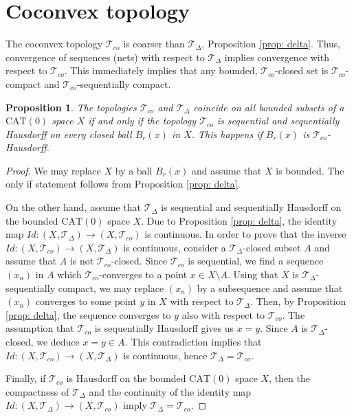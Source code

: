 \documentclass[12pt,leqno]{amsart}
\numberwithin{equation}{section}
\newtheorem{prop}[thm]{Proposition}
\theoremstyle{remark}
\newcommand{\CAT}{\mathrm{CAT}}
\begin{document}
\section{Coconvex topology} \label{sec: conv}
The coconvex topology $\mathcal T_{co}$ is coarser than $\mathcal T_{\Delta}$, Proposition \ref{prop: delta}.
Thus, convergence of sequences (nets) with respect to $\mathcal T_{\Delta}$ implies convergence with respect to $\mathcal T_{co}$.
This immediately implies that any bounded, $\mathcal T_{co}$-closed set is $\mathcal T_{co}$-compact and $\mathcal T_{co}$-sequentially compact.

\begin{prop}
The topologies $\mathcal T_{co}$ and $\mathcal T_{\Delta}$ coincide on all bounded subsets of a $\CAT(0)$ space $X$ if and only if the topology $\mathcal T_{co}$ is sequential and sequentially Hausdorff on every closed ball $B_r(x)$ in $X$.
This happens if $B_r(x)$ is $\mathcal T_{co}$-Hausdorff.
\end{prop}

\begin{proof}
We may replace $X$ by a ball $B_r(x)$ and assume that $X$ is bounded. The only if statement follows from Proposition \ref{prop: delta}. 

On the other hand, assume that $\mathcal T_{\Delta}$ is sequential and sequentially Hausdorff on the bounded $\CAT(0)$ space $X$. Due to Proposition \ref{prop: delta}, the identity map
$Id\colon (X, \mathcal T_{\Delta}) \to (X, \mathcal T_{co} )$ is continuous. 
In order to prove that the inverse $Id\colon(X, \mathcal T_{co}) \to (X, \mathcal T_{\Delta})$ is continuous, consider a $\mathcal T_{\Delta}$-closed subset $A$ and assume that 
$A$ is not $\mathcal T_{co}$-closed. Since $\mathcal T_{co}$ is sequential, we find a sequence $(x_n)$ in $A$ which $\mathcal T_{co}$-converges to a point $x \in X\setminus A$. Using that $X$ is $\mathcal T_{\Delta}$-sequentially compact, we may replace $(x_n)$ by a subsequence and assume that $(x_n)$ converges to some point $y$ in $X$ with respect to $\mathcal T_{\Delta}$.
Then, by Proposition \ref{prop: delta}, the sequence converges to $y$ also with respect to $\mathcal T_{co}$. The assumption that $\mathcal T_{co}$ is sequentially Hausdorff gives us 
$x=y$. Since $A$ is $\mathcal T_{\Delta}$-closed, we deduce $x=y\in A$. This contradiction implies that $Id\colon(X, \mathcal T_{co} ) \to (X, \mathcal T_{\Delta})$ is continuous, hence
$\mathcal T_{\Delta} =\mathcal T_{co}$.
 

Finally, if $\mathcal T_{co}$ is Hausdorff on the bounded $\CAT(0)$ space $X$, then the compactness
of $\mathcal T_{\Delta}$ and the continuity of the identity map
$Id\colon (X, \mathcal T_{\Delta}) \to (X, \mathcal T_{co} )$ imply $\mathcal T_{\Delta} =\mathcal T_{co}$.
\end{proof}
\end{document}
